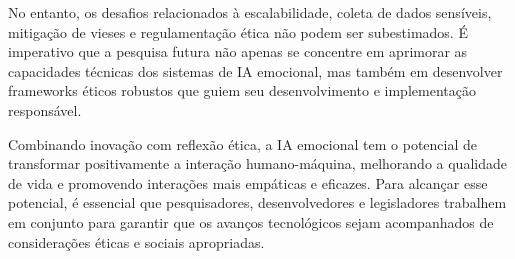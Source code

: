 \documentclass[a4paper,12pt]{report}
\begin{document}
	No entanto, os desafios relacionados à escalabilidade, coleta de dados sensíveis, mitigação de vieses e regulamentação ética não podem ser subestimados. É imperativo que a pesquisa futura não apenas se concentre em aprimorar as capacidades técnicas dos sistemas de IA emocional, mas também em desenvolver frameworks éticos robustos que guiem seu desenvolvimento e implementação responsável.
	
	Combinando inovação com reflexão ética, a IA emocional tem o potencial de transformar positivamente a interação humano-máquina, melhorando a qualidade de vida e promovendo interações mais empáticas e eficazes. Para alcançar esse potencial, é essencial que pesquisadores, desenvolvedores e legisladores trabalhem em conjunto para garantir que os avanços tecnológicos sejam acompanhados de considerações éticas e sociais apropriadas.
	
	\newpage
	
	\printbibliography
	
\end{document}

